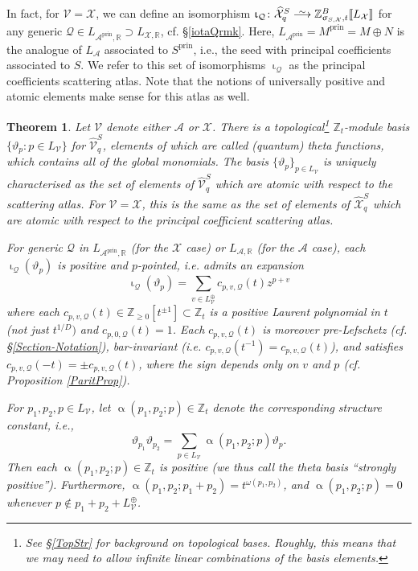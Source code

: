 \documentclass{amsart}
\DeclareMathOperator{\prin}{prin}
\let\llb=\llbracket
\let\rrb=\rrbracket
\let\bb=\mathbb
\let\s=\mathcal
\let\wh=\widehat
\def\risom{\buildrel\sim\over{\smashedlongrightarrow}}
\def\smashedlongrightarrow{\setbox0=\hbox{$\longrightarrow$}\ht0=1.25pt\box0}
\newcommand {\Zt} {\Z_t}
\newcommand {\sQ} {\mathcal{Q}}
\renewcommand{\iota}{\upiota}
\renewcommand{\alpha}{\upalpha}
\renewcommand{\sigma}{\upsigma}
\theoremstyle{plain}%
\newtheorem{thm}{Theorem}[section]
\newcommand{\Z}{{\mathbb Z}}
\theoremstyle{definition}
\theoremstyle{remark}
\begin{document}
In fact, for $\s{V}=\s{X}$, we can define an isomorphism $\iota_{\sQ}\colon\wh{\s{X}}^S_{q} \risom \Z_{\sigma_{S,\s{X}},t}^{B}\llb L_{\s{X}}\rrb$ for any generic $\sQ\in L_{\s{A}^{\prin},\bb{R}}\supset L_{\s{X},\bb{R}}$, cf. \S \ref{iotaQrmk}. Here, $L_{\s{A}^{\prin}}=M^{\prin}=M\oplus N$ is the analogue of $L_{\s{A}}$ associated to $S^{\prin}$, i.e., the seed with principal coefficients associated to $S$.  We refer to this set of isomorphisms $\iota_{\sQ}$ as the principal coefficients scattering atlas.  Note that the notions of universally positive and atomic elements make sense for this atlas as well.
 


\begin{thm}\label{MainThm}
Let $\s{V}$ denote either $\s{A}$ or $\s{X}$.  There is a topological\footnote{See \S \ref{TopStr} for background on topological bases.  Roughly, this means that we may need to allow infinite linear combinations of the basis elements.} $\Zt$-module basis $\{\vartheta_p\colon p\in L_{\s{V}}\}$ for $\wh{\s{V}}_q^S$, elements of which are called (quantum) theta functions, which contains all of the global monomials.  The basis $\{\vartheta_p\}_{p\in L_{\s{V}}}$ is uniquely characterised as the set of elements of $\wh{\s{V}}^{S}_q$ which are atomic with respect to the scattering atlas.  For $\s{V}=\s{X}$, this is the same as the set of elements of $\wh{\s{X}}^{S}_q$ which are atomic with respect to the principal coefficient scattering atlas.

For generic $\sQ$ in $ L_{\s{A}^{\prin},\bb{R}}$ (for the $\s{X}$ case) or $L_{\s{A},\bb{R}}$ (for the $\s{A}$ case), each $\iota_{\sQ}(\vartheta_p)$ is positive and $p$-pointed, i.e. admits an expansion
    \begin{equation}
        \label{iota_expansion}
    \iota_{\sQ}(\vartheta_p)=\sum_{v\in L_{\s{V}}^{\oplus}}c_{p,v,\sQ}(t)z^{p+v}
    \end{equation}
where each $c_{p,v,\sQ}(t)\in\mathbb{Z}_{\geq 0}[t^{\pm 1}]\subset \Zt$ is a positive Laurent polynomial in $t$ (not just $t^{1/D})$ and $c_{p,0,\sQ}(t)=1$.  Each $c_{p,v,\sQ}(t)$ is moreover pre-Lefschetz (cf. \S \ref{Section-Notation}), bar-invariant (i.e. $c_{p,v,\sQ}(t^{-1})=c_{p,v,\sQ}(t)$), and satisfies $c_{p,v,\sQ}(-t)=\pm c_{p,v,\sQ}(t)$, where the sign depends only on $v$ and $p$ (cf. Proposition \ref{ParitProp}).

For $p_1,p_2,p\in L_{\s{V}}$, let $\alpha(p_1,p_2;p)\in \Zt$ denote the corresponding structure constant, i.e., 
    \begin{equation}
    \label{c_expansion}
        \vartheta_{p_1}\vartheta_{p_2}=\sum_{p\in L_{\s{V}}} \alpha(p_1,p_2;p) \vartheta_p.
    \end{equation} 
    Then each $\alpha(p_1,p_2;p)\in\bb{Z}_t$ is positive (we thus call the theta basis ``strongly positive'').  Furthermore, $\alpha(p_1,p_2;p_1+p_2)=t^{\omega(p_1,p_2)}$, and $\alpha(p_1,p_2;p)=0$ whenever $p\notin p_1+p_2+L_{\s{V}}^{\oplus}$. 
    \end{thm}
    
\end{document}
